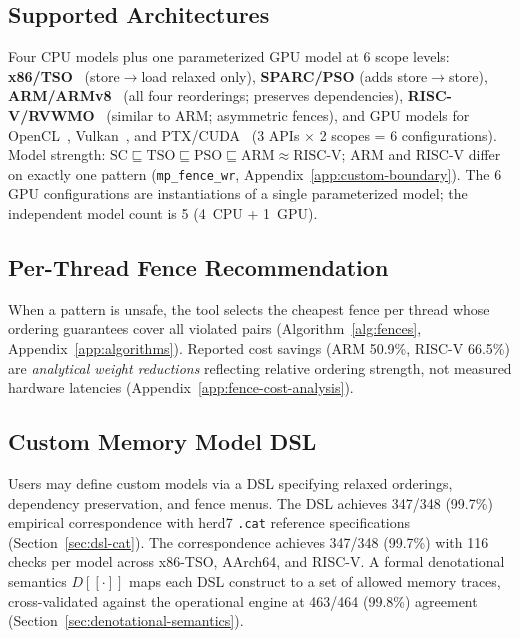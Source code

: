 \documentclass[11pt]{article}
\begin{document}
\subsection{Supported Architectures}

Four CPU models plus one parameterized GPU model at 6 scope levels:
\textbf{x86/TSO}~\cite{OwensSarkarSewell2009} (store$\to$load relaxed only),
\textbf{SPARC/PSO} (adds store$\to$store),
\textbf{ARM/ARMv8}~\cite{Pulte2018} (all four reorderings; preserves
dependencies),
\textbf{RISC-V/RVWMO}~\cite{RISCV2019} (similar to ARM; asymmetric fences),
and GPU models for OpenCL~\cite{Sorensen2016},
Vulkan~\cite{KhronosVulkan}, and PTX/CUDA~\cite{Lustig2019}
(3 APIs $\times$ 2 scopes = 6 configurations).
Model strength: $\text{SC} \sqsubseteq \text{TSO} \sqsubseteq \text{PSO}
\sqsubseteq \text{ARM} \approx \text{RISC-V}$;
ARM and RISC-V differ on exactly one pattern (\texttt{mp\_fence\_wr},
Appendix~\ref{app:custom-boundary}).
The 6 GPU configurations are instantiations of a single parameterized
model; the independent model count is 5 (4~CPU + 1~GPU).

\subsection{Per-Thread Fence Recommendation}

When a pattern is unsafe, the tool selects the cheapest fence per
thread whose ordering guarantees cover all violated pairs
(Algorithm~\ref{alg:fences}, Appendix~\ref{app:algorithms}).
Reported cost savings (ARM 50.9\%, RISC-V 66.5\%) are \emph{analytical
weight reductions} reflecting relative ordering strength, not measured
hardware latencies (Appendix~\ref{app:fence-cost-analysis}).

\subsection{Custom Memory Model DSL}

Users may define custom models via a DSL specifying relaxed orderings,
dependency preservation, and fence menus. The DSL achieves 347/348
(99.7\%) empirical correspondence with herd7 \texttt{.cat} reference
specifications (Section~\ref{sec:dsl-cat}).  The correspondence
achieves 347/348 (99.7\%) with 116 checks per model across
x86-TSO, AArch64, and RISC-V.
A formal denotational semantics $D[\![\cdot]\!]$ maps each DSL construct
to a set of allowed memory traces, cross-validated against the operational
engine at 463/464 (99.8\%) agreement (Section~\ref{sec:denotational-semantics}).
\end{document}
